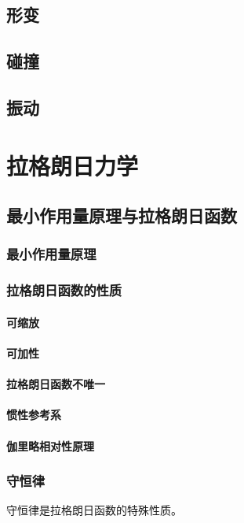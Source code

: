 \subsection{形变}

\subsection{碰撞}

\subsection{振动}

\section{拉格朗日力学}
\subsection{最小作用量原理与拉格朗日函数}
\subsubsection{最小作用量原理}


\subsubsection{拉格朗日函数的性质}
\paragraph*{可缩放}

\paragraph*{可加性}

\paragraph*{拉格朗日函数不唯一}

\paragraph*{惯性参考系}

\paragraph*{伽里略相对性原理}
\subsubsection{守恒律}
守恒律是拉格朗日函数的特殊性质。


